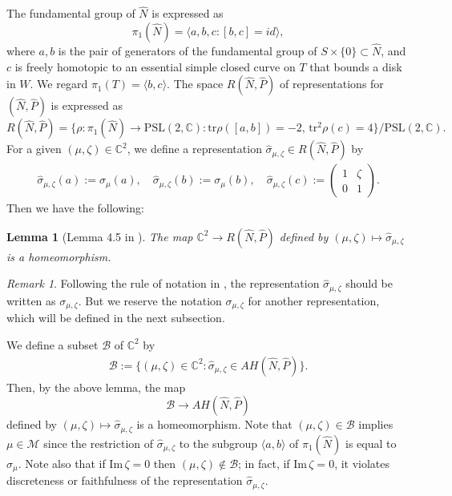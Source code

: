 \documentclass[12pt]{article}
\theoremstyle{plain}
\newtheorem{lem}[thm]{Lemma}
\theoremstyle{definition}
\theoremstyle{remark}
\newtheorem*{rem}{Remark}
\newcommand{\C}{\mathbb C}
\newcommand{\M}{\mathcal M}
\newcommand{\B}{\mathcal B}
\newcommand{\hN}{{\hat N}}
\newcommand{\hP}{{\hat P}}
\newcommand{\la}{\langle}
\newcommand{\ra}{\rangle}
\newcommand{\ze}{\zeta}
\newcommand{\tr}{{\mathrm{tr}}}
\newcommand{\id}{\mathit{id}}
\newcommand{\im}{\mathrm{Im}}
\newcommand{\psl}{{\mathrm{PSL}}(2,\mathbb C)}
\begin{document}
The fundamental group of $\hN$ is expressed as 
$$
\pi_1(\hat N)=\la a,b,c : [b,c]=\id\ra, 
$$
where $a,b$ is the pair of generators of the fundamental group of $S \times \{0\}  \subset  \hN$, 
and $c$ is freely homotopic to an essential simple closed curve on $T$ that bounds a disk in $W$. 
We regard $\pi_1(T)=\la b,c \ra$. 
The space $R(\hat N,\hat P)$ of representations for $(\hN,\hP)$ is expressed as 
$$
R(\hat N,\hat P)=\{\rho:\pi_1(\hat N) \to \psl  : \tr \rho([a,b])=-2, \, \tr^2 \rho(c)=4 \}/\psl. 
$$
For a given $(\mu,\zeta) \in \C^2$, we define a representation 
$\hat\sigma_{\mu,\zeta} \in R(\hN,\hP)$ by 
\begin{eqnarray*}
\hat \sigma_{\mu,\zeta}(a):=\sigma_\mu(a), \quad 
\hat \sigma_{\mu,\zeta}(b):=\sigma_\mu(b), \quad 
\hat\sigma_{\mu,\zeta}(c):=\left(\begin{array}{cc}
  1& \zeta \\ 
0 & 1
 \end{array}\right). 
\end{eqnarray*}
%
Then  we have the following: 
\begin{lem}[Lemma 4.5 in \cite{Br}]
The map $\C^2 \to R(\hN,\hP)$ defined by $(\mu,\zeta) \mapsto \hat \sigma_{\mu,\zeta}$
is a homeomorphism. 
\end{lem}
%
\begin{rem}
Following the rule of notation in \cite{Br}, the representation $\hat \sigma_{\mu,\ze}$ 
should be written as $\sigma_{\mu,\ze}$. But we reserve the notation $\sigma_{\mu,\ze}$ 
for another representation, which will be defined in the next subsection. 
\end{rem}
%
We define a subset $\B$ of $\C^2$ by 
\begin{eqnarray*}
\B:=\{(\mu,\zeta) \in \C^2 : \hat \sigma_{\mu,\zeta}  \in  AH(\hN,\hP)\}.  
\end{eqnarray*}
%
Then, by the above lemma, 
 the map 
 $$\B \to AH(\hN,\hP)$$ 
 defined by 
$(\mu,\ze) \mapsto \hat\sigma_{\mu,\ze}$ is a homeomorphism. 
Note that 
 $(\mu,\ze) \in \B$ implies $\mu \in \M$ since 
 the restriction of $\hat \sigma_{\mu,\ze}$ 
 to the subgroup ${\la a, b\ra}$ of $\pi_1(\hN)$ 
 is equal to $\sigma_\mu$. 
 Note also that if $\im\,\ze=0$ then $(\mu,\ze) \not\in\B$; in fact, 
 if $\im\,\ze=0$, it violates discreteness or faithfulness of the representation $\hat \sigma_{\mu,\ze}$. 
\end{document}
